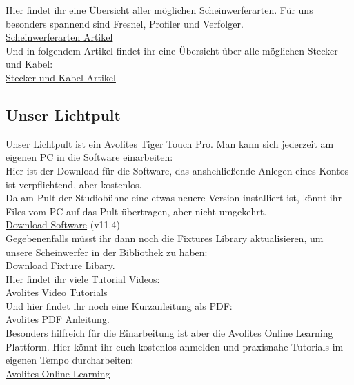\noindent Hier findet ihr eine Übersicht aller möglichen Scheinwerferarten. Für uns besonders spannend sind Fresnel, Profiler und Verfolger.\\
\href{https://wiki.production-partner.de/licht/welches-licht-macht-welcher-scheinwerfer/}{Scheinwerferarten Artikel}\\

\noindent Und in folgendem Artikel findet ihr eine Übersicht über alle möglichen Stecker und Kabel: \\
\href{https://www.stage223.com/wissen/steckerarten-fuer-strom-in-der-veranstaltungstechnik-what-the-plug/}{Stecker und Kabel Artikel}

\subsection{Unser Lichtpult}
Unser Lichtpult ist ein Avolites Tiger Touch Pro. Man kann sich jederzeit am eigenen PC in die Software einarbeiten:\\
Hier ist der Download für die Software, das anshchließende Anlegen eines Kontos ist verpflichtend, aber kostenlos.\\
Da am Pult der Studiobühne eine etwas neuere Version installiert ist, könnt ihr Files vom PC auf das Pult übertragen, aber nicht umgekehrt.\\
\href{https://web3.avolites.com/software/downloads/titan-pc-suite}{Download Software} (v11.4)\\

\noindent Gegebenenfalls müsst ihr dann noch die Fixtures Library aktualisieren, um unsere Scheinwerfer in der Bibliothek zu haben:\\
\href{https://personalities.avolites.com/PersonalityFiles/Downloads/TitanFixtureLibraryV10.exe}{Download Fixture Libary}.\\

\noindent Hier findet ihr viele Tutorial Videos:\\
\href{https://www.avolites.com/support/tutorials-guides/}{Avolites Video Tutorials}\\

\noindent Und hier findet ihr noch eine Kurzanleitung als PDF:\\
\href{https://web3.avolites.com/Portals/0/downloads/manuals/titanone/Titan%20One%20Quick%20Start%20Guide.pdf?ver=2019-06-06-150613-817}{Avolites PDF Anleitung}.\\

\noindent Besonders hilfreich für die Einarbeitung ist aber die Avolites Online Learning Plattform. Hier könnt ihr euch kostenlos anmelden und praxisnahe Tutorials im eigenen Tempo durcharbeiten:\\
\href{https://www.avolitesacademy.com/online-learning/}{Avolites Online Learning}\\
